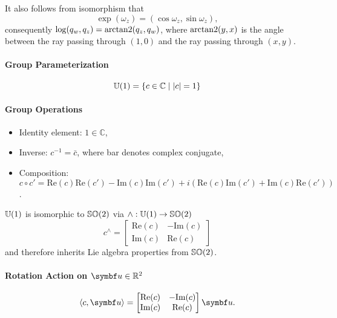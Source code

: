 It also follows from isomorphism that 
$$
  \exp(\omega_{z}) = (\cos \omega_{z}, \sin \omega_{z}),
$$
consequently $\log (q_{w}, q_{z}) = \operatorname{arctan2}(q_{z}, q_{w})$, where $\operatorname{arctan2}(y, x)$ is the angle between the ray passing through $(1, 0)$ and the ray passing through $(x, y)$.

\begin{properties}[breakable, title={$\Uone$ as a parameterization of $\SOtwo$}]
  \paragraph{Group Parameterization}
  \begin{equation}
    {\mathbb{U}(1)} = \left\{ c \in \mathbb{C} \mid |c| = 1 \right\}
  \end{equation}
  \paragraph{Group Operations}
  \begin{itemize}
    \item Identity element: $1 \in \mathbb{C}$,
    \item Inverse: $c^{-1} = \bar c$, where bar denotes complex conjugate,
    \item Composition: $c \circ c' = \textrm{Re}(c) \textrm{Re}(c') - \textrm{Im}(c)\textrm{Im}(c') + i \left(\textrm{Re}(c) \textrm{Im}(c') + \textrm{Im}(c) \textrm{Re}(c') \right)$.
  \end{itemize}

  $\Uone$ is isomorphic to $\SOtwo$ via $\wedge: {\mathbb{U}(1)} \rightarrow {\mathbb{SO}(2)}$
  \begin{equation}
    c^{\wedge} = \begin{bmatrix} \textrm{Re}(c) & -\textrm{Im}(c) \\ \textrm{Im}(c) & \textrm{Re}(c) \end{bmatrix}
  \end{equation}
  and therefore inherits Lie algebra properties from $\SOtwo$.

  \paragraph{Rotation Action on $\bu \in \mathbb{R}^{2}$}
  \begin{equation}
    \left\langle c, \bu \right \rangle = \begin{bmatrix} \textrm{Re}(c) & -\textrm{Im}(c) \\ \textrm{Im}(c) & \textrm{Re}(c) \end{bmatrix} \bu.
  \end{equation}


\end{properties}
